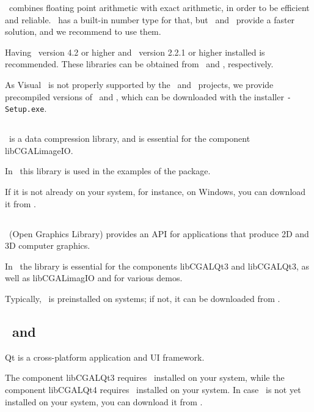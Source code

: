\cgal\ combines floating point arithmetic with exact arithmetic,
in order to be efficient and reliable. \cgal\ has a built-in 
number type for that, but \gmp\ and \mpfr\ provide a faster
solution, and we recommend to use them.

Having \gmp\ version 4.2 or higher and \mpfr\ version 2.2.1 or higher
installed is recommended. These libraries can be obtained from
\gmppage\ and \mpfrpage, respectively. 

As Visual \CC\ is not properly
supported by the \gmp\ and \mpfr\ projects, we provide precompiled versions
of \gmp\ and \mpfr, which can be downloaded with the installer
\texttt{\cgalrel-Setup.exe}.

\subsection{\zlib \label{thirdparty:zlib}}

\zlib\ is a data compression library, and is essential for the component libCGALimageIO.

In \cgal\ this library is used in the examples of the  package.

If it is not already on your system,
for instance, on Windows, you can download it from  \zlibpage.

\subsection{\opengl \label{thirdparty:OpenGL}}

\opengl\ (Open Graphics Library) provides an API for applications that
produce 2D and 3D computer graphics.

In \cgal\ the library is essential for the components libCGALQt3 and
libCGALQt3, as well as libCGALimagIO and for various demos.

Typically, \opengl\ is preinstalled on systems; if not, it can be
downloaded from \openglpage.

\subsection{\ and \label{thirdparty:Qt3}\label{thirdparty:Qt4}\label{thirdparty:Qt}}

Qt is a cross-platform application and UI framework.

The component libCGALQt3 requires \ installed on your system, while
the component libCGALQt4 requires \ installed on your system. 
In case \qt\ is not yet installed on your system, you can download 
it from \qtpage. 

